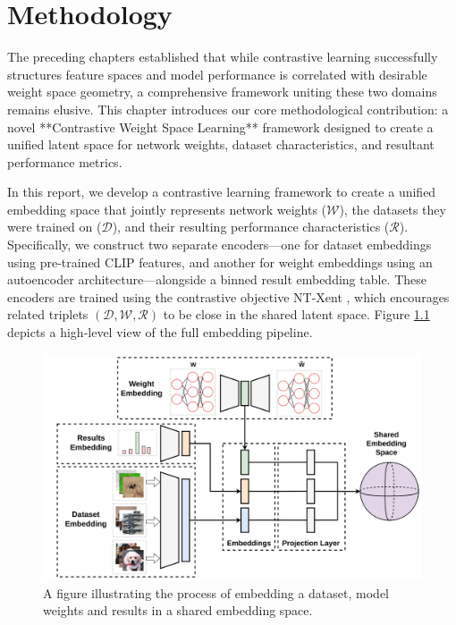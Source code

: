 \graphicspath{{fig/}}

\chapter{Methodology}
\label{chap:method}



The preceding chapters established that while contrastive learning successfully structures feature spaces and model performance is correlated with desirable weight space geometry, a comprehensive framework uniting these two domains remains elusive. This chapter introduces our core methodological contribution: a novel **Contrastive Weight Space Learning** framework designed to create a unified latent space for network weights, dataset characteristics, and resultant performance metrics.

In this report, we develop a contrastive learning framework to create a unified embedding space that jointly represents network weights ($\mathcal{W}$), the datasets they were trained on ($\mathcal{D}$), and their resulting performance characteristics ($\mathcal{R}$). Specifically, we construct two separate encoders—one for dataset embeddings using pre-trained CLIP features, and another for weight embeddings using an autoencoder architecture—alongside a binned result embedding table. These encoders are trained using the contrastive objective NT-Xent \cite{agren2022ntxentlossupperbound}, which encourages related triplets $(\mathcal{D}, \mathcal{W}, \mathcal{R})$ to be close in the shared latent space. Figure \ref{fig:pipeline_2} depicts a high-level view of the full embedding pipeline.

\begin{figure}[!t]
    \centering
    \includegraphics[width=0.75\linewidth]{pipeline.png}
    \caption[A figure illustrating the process of embedding a dataset, model weigths and results into a shared embedding space ]{A figure illustrating the process of embedding a dataset, model weights and results in a shared embedding space. }
    \label{fig:pipeline_2}
\end{figure}


